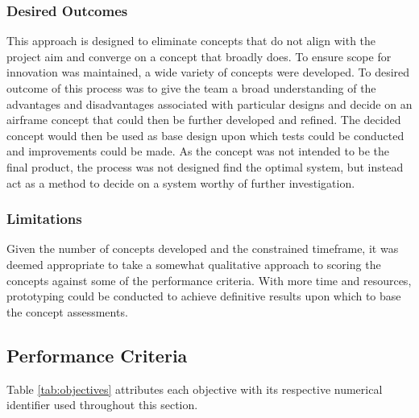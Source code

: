 \subsubsection{Desired Outcomes}

This approach is designed to eliminate concepts that do not align with the project aim and converge on a concept that broadly does. To ensure scope for innovation was maintained, a wide variety of concepts were developed. To desired outcome of this process was to give the team a broad understanding of the advantages and disadvantages associated with particular designs and decide on an airframe concept that could then be further developed and refined. The decided concept would then be used as base design upon which tests could be conducted and improvements could be made. As the concept was not intended to be the final product, the process was not designed find the optimal system, but instead act as a method to decide on a system worthy of further investigation.



\subsubsection{Limitations}

Given the number of concepts developed and the constrained timeframe, it was deemed appropriate to take a somewhat qualitative approach to scoring the concepts against some of the performance criteria. With more time and resources, prototyping could be conducted to achieve definitive results upon which to base the concept assessments.

\subsection{Performance Criteria}\label{perfcrit}


Table \ref{tab:objectives} attributes each objective with its respective numerical identifier used throughout this section.

